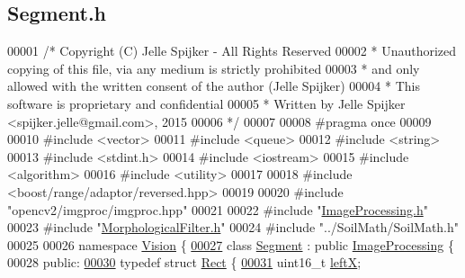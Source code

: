 \hypertarget{_segment_8h_source}{}\subsection{Segment.\+h}
\label{_segment_8h_source}

\begin{DoxyCode}
00001 \textcolor{comment}{/* Copyright (C) Jelle Spijker - All Rights Reserved}
00002 \textcolor{comment}{ * Unauthorized copying of this file, via any medium is strictly prohibited}
00003 \textcolor{comment}{ * and only allowed with the written consent of the author (Jelle Spijker)}
00004 \textcolor{comment}{ * This software is proprietary and confidential}
00005 \textcolor{comment}{ * Written by Jelle Spijker <spijker.jelle@gmail.com>, 2015}
00006 \textcolor{comment}{ */}
00007 
00008 \textcolor{preprocessor}{#pragma once}
00009 
00010 \textcolor{preprocessor}{#include <vector>}
00011 \textcolor{preprocessor}{#include <queue>}
00012 \textcolor{preprocessor}{#include <string>}
00013 \textcolor{preprocessor}{#include <stdint.h>}
00014 \textcolor{preprocessor}{#include <iostream>}
00015 \textcolor{preprocessor}{#include <algorithm>}
00016 \textcolor{preprocessor}{#include <utility>}
00017 
00018 \textcolor{preprocessor}{#include <boost/range/adaptor/reversed.hpp>}
00019 
00020 \textcolor{preprocessor}{#include "opencv2/imgproc/imgproc.hpp"}
00021 
00022 \textcolor{preprocessor}{#include "\hyperlink{_image_processing_8h}{ImageProcessing.h}"}
00023 \textcolor{preprocessor}{#include "\hyperlink{_morphological_filter_8h}{MorphologicalFilter.h}"}
00024 \textcolor{preprocessor}{#include "../SoilMath/SoilMath.h"}
00025 
00026 \textcolor{keyword}{namespace }\hyperlink{namespace_vision}{Vision} \{
\hypertarget{_segment_8h_source_l00027}{}\hyperlink{class_vision_1_1_segment}{00027} \textcolor{keyword}{class }\hyperlink{class_vision_1_1_segment}{Segment} : \textcolor{keyword}{public} \hyperlink{class_vision_1_1_image_processing}{ImageProcessing} \{
00028 \textcolor{keyword}{public}:
\hypertarget{_segment_8h_source_l00030}{}\hyperlink{struct_vision_1_1_segment_1_1_rect}{00030}   \textcolor{keyword}{typedef} \textcolor{keyword}{struct }\hyperlink{struct_vision_1_1_segment_1_1_rect}{Rect} \{
\hypertarget{_segment_8h_source_l00031}{}\hyperlink{struct_vision_1_1_segment_1_1_rect_acf3a2a045d75348971e57df5eeb7808e}{00031}     uint16\_t \hyperlink{struct_vision_1_1_segment_1_1_rect_acf3a2a045d75348971e57df5eeb7808e}{leftX};  

\end{DoxyCode}
